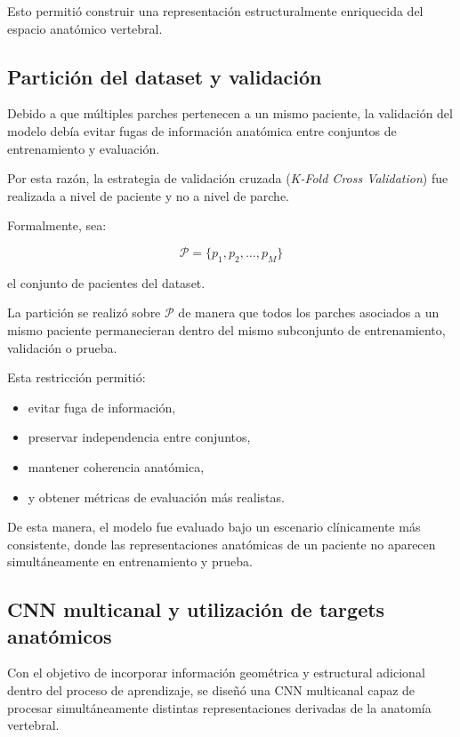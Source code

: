 \documentclass[conference]{IEEEtran}
\begin{document}
Esto permitió construir una representación estructuralmente enriquecida del espacio anatómico vertebral.

\subsection{Partición del dataset y validación}

Debido a que múltiples parches pertenecen a un mismo paciente, la validación del modelo debía evitar fugas de información anatómica entre conjuntos de entrenamiento y evaluación.

Por esta razón, la estrategia de validación cruzada (\textit{K-Fold Cross Validation}) fue realizada a nivel de paciente y no a nivel de parche.

Formalmente, sea:

\[
\mathcal{P}=\{p_1,p_2,\dots,p_M\}
\]

el conjunto de pacientes del dataset.

La partición se realizó sobre $\mathcal{P}$ de manera que todos los parches asociados a un mismo paciente permanecieran dentro del mismo subconjunto de entrenamiento, validación o prueba.

Esta restricción permitió:

\begin{itemize}
    \item evitar fuga de información,
    \item preservar independencia entre conjuntos,
    \item mantener coherencia anatómica,
    \item y obtener métricas de evaluación más realistas.
\end{itemize}

De esta manera, el modelo fue evaluado bajo un escenario clínicamente más consistente, donde las representaciones anatómicas de un paciente no aparecen simultáneamente en entrenamiento y prueba.



\subsection{CNN multicanal y utilización de targets anatómicos}

Con el objetivo de incorporar información geométrica y estructural adicional dentro del proceso de aprendizaje, se diseñó una CNN multicanal capaz de procesar simultáneamente distintas representaciones derivadas de la anatomía vertebral.
\end{document}
